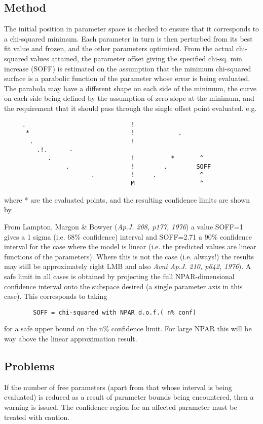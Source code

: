 \documentclass{book}
\renewcommand{\_}{{\tt\char'137}}     %
\begin{document}
\subsection{Method}
The initial position in parameter space is checked to ensure that
it corresponds to a chi-squared minimum. Each parameter in turn
is then perturbed from its best fit value and frozen, and the
other parameters optimised. From the actual chi-squared values
attained, the parameter offset giving the specified chi-sq. min
increase (SOFF) is estimated on the assumption that the minimum
chi-squared surface is a parabolic function of the parameter
whose error is being evaluated. The parabola may have a different
shape on each side of the minimum, the curve on each side being
defined by the assumption of zero slope at the minimum, and the
requirement that it should pass through the single offset point
evaluated. e.g.
\begin{verbatim}
     .                             !
      *                            !            .
       .                           !
         .!.      -
            .                      !          *       ^
                 .                 !        .        SOFF
                        .          !     .            ^
                                   M                  ^
  \end{verbatim}
where * are the evaluated points, and the resulting confidence
limits are shown by .
 
From Lampton, Margon \& Bowyer ({\em Ap.J. 208, p177, 1976}) a value
SOFF=1 gives a 1 sigma (i.e. 68\% confidence) interval and
SOFF=2.71 a 90\% confidence interval for the case where the model
is linear (i.e. the predicted values are linear functions of the
parameters). Where this is not the case (i.e. always!) the
results may still be approximately right LMB and also {\em Avni Ap.J.
210, p642, 1976}). A safe limit in all cases is obtained by
projecting the full NPAR-dimensional confidence interval onto the
subspace desired (a single parameter axis in this case). This
corresponds to taking
 
\begin{verbatim}
        SOFF = chi-squared with NPAR d.o.f.( n% conf)
\end{verbatim}
for a safe upper bound on the n\% confidence limit. For large NPAR
this will be way above the linear approximation result.
 
\subsection{Problems}
If the number of free parameters (apart from that whose interval
is being evaluated) is reduced as a result of parameter bounds
being encountered, then a warning is issued. The confidence
region for an affected parameter must be treated with caution.
 
\end{document}
